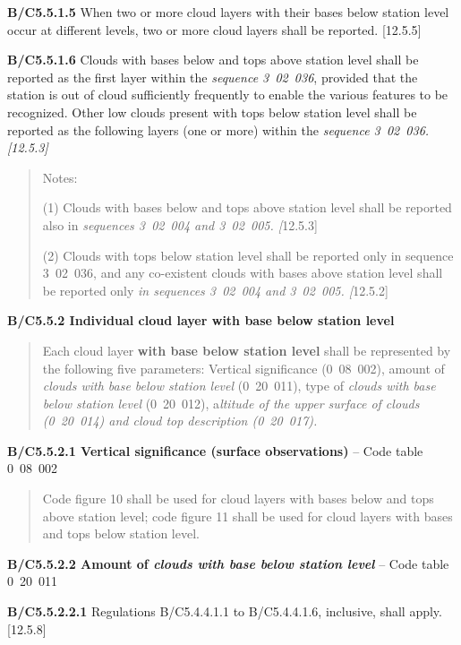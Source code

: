 \textbf{B/C5.5.1.5} When two or more cloud layers with their bases below station level occur at different levels, two or more cloud layers shall be reported. {[}12.5.5{]}

\textbf{B/C5.5.1.6} Clouds with bases below and tops above station level shall be reported as the first layer within the \emph{sequence 3~02~036}, provided that the station is out of cloud sufficiently frequently to enable the various features to be recognized. Other low clouds present with tops below station level shall be reported as the following layers (one or more) within the \emph{sequence 3~02~036.} \emph{{[}12.5.3{]}}

\begin{quote}
Notes:

(1) Clouds with bases below and tops above station level shall be reported also in \emph{sequences 3~02~004 and 3~02~005. {[}}12.5.3{]}

(2) Clouds with tops below station level shall be reported only in sequence 3\emph{~}02\emph{~}036, and any co-existent clouds with bases above station level shall be reported only \emph{in sequences 3~02~004 and 3~02~005. {[}}12.5.2{]}
\end{quote}

\textbf{B/C5.5.2 Individual cloud layer with base below station level}

\begin{quote}
Each cloud layer \textbf{with base below station level} shall be represented by the following five parameters: Vertical significance (0~08~002), amount of \emph{clouds with base below station level} (0~20~011), type of \emph{clouds with base below station level} (0~20~012), a\emph{ltitude of the upper surface of clouds (0}~\emph{20~014) and cloud top description (0}~\emph{20~017).}
\end{quote}

\textbf{B/C5.5.2.1 Vertical significance (surface observations)} -- Code table 0~08~002

\begin{quote}
Code figure 10 shall be used for cloud layers with bases below and tops above station level; code figure 11 shall be used for cloud layers with bases and tops below station level.
\end{quote}

\textbf{B/C5.5.2.2 Amount of \emph{clouds with base below station level}} -- Code table 0~20~011

\textbf{B/C5.5.2.2.1} Regulations B/C5.4.4.1.1 to B/C5.4.4.1.6, inclusive, shall apply. {[}12.5.8{]}

